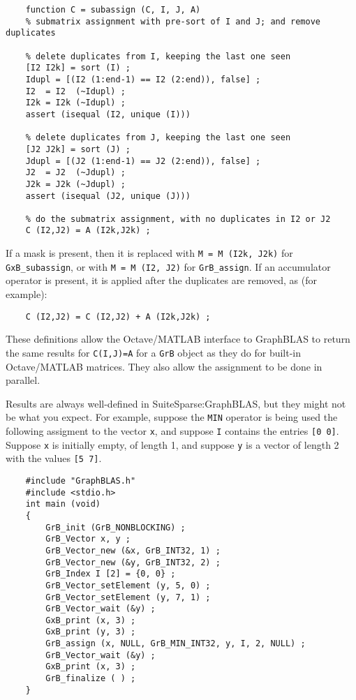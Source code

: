 \documentclass[12pt]{article}
\begin{document}
{\small
\begin{verbatim}
    function C = subassign (C, I, J, A)
    % submatrix assignment with pre-sort of I and J; and remove duplicates

    % delete duplicates from I, keeping the last one seen
    [I2 I2k] = sort (I) ;
    Idupl = [(I2 (1:end-1) == I2 (2:end)), false] ;
    I2  = I2  (~Idupl) ;
    I2k = I2k (~Idupl) ;
    assert (isequal (I2, unique (I)))

    % delete duplicates from J, keeping the last one seen
    [J2 J2k] = sort (J) ;
    Jdupl = [(J2 (1:end-1) == J2 (2:end)), false] ;
    J2  = J2  (~Jdupl) ;
    J2k = J2k (~Jdupl) ;
    assert (isequal (J2, unique (J)))

    % do the submatrix assignment, with no duplicates in I2 or J2
    C (I2,J2) = A (I2k,J2k) ;
\end{verbatim}}

If a mask is present, then it is replaced with \verb'M = M (I2k, J2k)' for
\verb'GxB_subassign', or with \verb'M = M (I2, J2)' for \verb'GrB_assign'.
If an accumulator operator is present, it is applied after the duplicates
are removed, as (for example):

{\small
\begin{verbatim}
    C (I2,J2) = C (I2,J2) + A (I2k,J2k) ;
\end{verbatim}}

These definitions allow the Octave/MATLAB interface to GraphBLAS to return the same
results for \verb'C(I,J)=A' for a \verb'GrB' object as they do for built-in
Octave/MATLAB matrices.  They also allow the assignment to be done in parallel.

Results are always well-defined in SuiteSparse:GraphBLAS, but they might not be
what you expect.  For example, suppose the \verb'MIN' operator is being used
the following assigment to the vector \verb'x', and suppose \verb'I' contains
the entries \verb'[0 0]'.  Suppose \verb'x' is initially empty, of length 1,
and suppose \verb'y' is a vector of length 2 with the values \verb'[5 7]'.

{\small
\begin{verbatim}
    #include "GraphBLAS.h"
    #include <stdio.h>
    int main (void)
    {
        GrB_init (GrB_NONBLOCKING) ;
        GrB_Vector x, y ;
        GrB_Vector_new (&x, GrB_INT32, 1) ;
        GrB_Vector_new (&y, GrB_INT32, 2) ;
        GrB_Index I [2] = {0, 0} ;
        GrB_Vector_setElement (y, 5, 0) ;
        GrB_Vector_setElement (y, 7, 1) ;
        GrB_Vector_wait (&y) ;
        GxB_print (x, 3) ;
        GxB_print (y, 3) ;
        GrB_assign (x, NULL, GrB_MIN_INT32, y, I, 2, NULL) ;
        GrB_Vector_wait (&y) ;
        GxB_print (x, 3) ;
        GrB_finalize ( ) ;
    }
\end{verbatim}}
\end{document}
